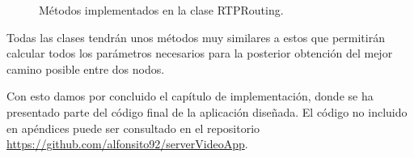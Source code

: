 \documentclass[a4paper,11pt]{book}
\begin{document}
\begin{figure}[tb]
\centering
{}

\caption{Métodos implementados en la clase RTPRouting.}
\end{figure}

Todas las clases tendrán unos métodos muy similares a estos que permitirán calcular todos los parámetros necesarios para la posterior obtención del mejor camino posible entre dos nodos.

Con esto damos por concluido el capítulo de implementación, donde se ha presentado parte del código final de la aplicación diseñada. El código no incluido en apéndices puede ser consultado en el repositorio \url{https://github.com/alfonsito92/serverVideoApp}.

%
%
\end{document}
